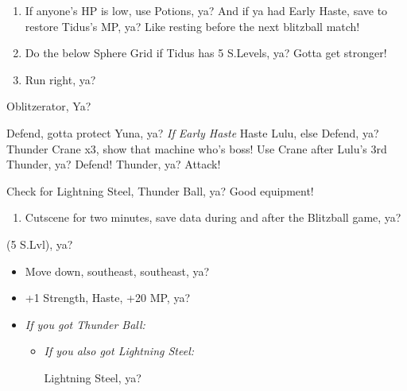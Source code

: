 \begin{enumerate}[resume]
    \item If anyone's HP is low, use Potions, ya? And if ya had Early Haste, save to restore Tidus's MP, ya? Like resting before the next blitzball match!
    \item Do the below Sphere Grid if Tidus has 5 S.Levels, ya? Gotta get stronger!
    \item Run right, ya?
\end{enumerate}
\begin{battle}[3000]{Oblitzerator, Ya?}
    \begin{itemize}
        \kimahrif Defend, gotta protect Yuna, ya?
        \tidusf \textit{If Early Haste} Haste Lulu, else Defend, ya?
        \luluf Thunder Crane x3, show that machine who's boss!
        \tidusf Use Crane after Lulu's 3rd Thunder, ya?
        \kimahrif Defend!
        \luluf Thunder, ya?
        \tidusf Attack!
    \end{itemize}
    Check for Lightning Steel, Thunder Ball, ya? Good equipment!
\end{battle}
\begin{enumerate}[resume]
    \item Cutscene for two minutes, save data during and after the Blitzball game, ya?
\end{enumerate}
\begin{spheregrid}
    \begin{itemize}
        \tidusf (5 S.Lvl), ya?
        \begin{itemize}
            \item Move down, southeast, southeast, ya?
            \item +1 Strength, Haste, +20 MP, ya?
        \end{itemize}
    \end{itemize}
\end{spheregrid}
\begin{equip}
    \begin{itemize}
        \item \textit{If you got Thunder Ball:}
        \begin{itemize}
            \wakkaf Thunder Ball, time to show 'em what's what!
            \item \textit{If you also got Lightning Steel:}
            \begin{itemize}
                \tidusf Lightning Steel, ya?
            \end{itemize}
        \end{itemize}
    \end{itemize}
\end{equip}
